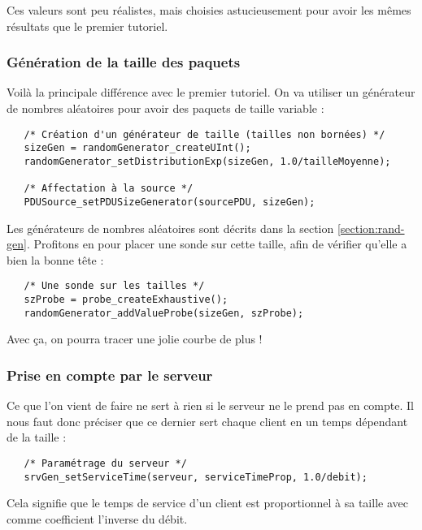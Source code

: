    Ces valeurs sont peu réalistes, mais choisies astucieusement pour
avoir les mêmes résultats que le premier tutoriel.

%
\subsubsection{Génération de la taille des paquets}

   Voilà la principale différence avec le premier tutoriel. On va
utiliser un générateur de nombres aléatoires pour avoir des paquets de
taille variable :

\begin{verbatim}
   /* Création d'un générateur de taille (tailles non bornées) */
   sizeGen = randomGenerator_createUInt();
   randomGenerator_setDistributionExp(sizeGen, 1.0/tailleMoyenne);

   /* Affectation à la source */
   PDUSource_setPDUSizeGenerator(sourcePDU, sizeGen);
\end{verbatim}

  Les générateurs de nombres aléatoires sont décrits dans la section
\ref{section:rand-gen}. Profitons en pour placer une sonde sur cette
taille, afin de vérifier qu'elle a bien la bonne tête :

\begin{verbatim}
   /* Une sonde sur les tailles */
   szProbe = probe_createExhaustive();
   randomGenerator_addValueProbe(sizeGen, szProbe);
\end{verbatim}

   Avec ça, on pourra tracer une jolie courbe de plus !

%
\subsubsection{Prise en compte par le serveur}

   Ce que l'on vient de faire ne sert à rien si le serveur ne le prend
pas en compte. Il nous faut donc préciser que ce dernier sert chaque
client en un temps dépendant de la taille :

\begin{verbatim}
   /* Paramétrage du serveur */
   srvGen_setServiceTime(serveur, serviceTimeProp, 1.0/debit);
\end{verbatim}

   Cela signifie que le temps de service d'un client est proportionnel
à sa taille avec comme coefficient l'inverse du débit.

